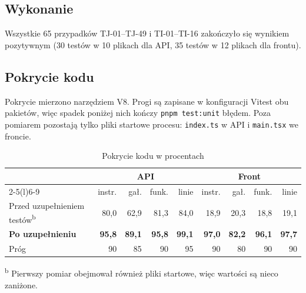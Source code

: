 \documentclass[a4paper,11pt]{article}
\newcommand{\code}[1]{\texttt{\small #1}}
\begin{document}
\subsection{Wykonanie}
Wszystkie 65 przypadków TJ-01–TJ-49 i TI-01–TI-16 zakończyło się wynikiem pozytywnym
(30 testów w 10 plikach dla API, 35 testów w 12 plikach dla frontu).

\subsection{Pokrycie kodu}
Pokrycie mierzono narzędziem V8. Progi są zapisane w konfiguracji Vitest obu pakietów,
więc spadek poniżej nich kończy \code{pnpm test:unit} błędem. Poza pomiarem pozostają tylko
pliki startowe procesu: \code{index.ts} w API i \code{main.tsx} we froncie.

\begin{table}[H]
\centering\small
\begin{tabular}{@{}l rrrr rrrr@{}}
\toprule
& \multicolumn{4}{c}{\textsf{\textbf{API}}} & \multicolumn{4}{c}{\textsf{\textbf{Front}}}\\
\cmidrule(lr){2-5}\cmidrule(l){6-9}
& instr. & gał. & funk. & linie & instr. & gał. & funk. & linie\\
\midrule
Przed uzupełnieniem testów\textsuperscript{b} & 80,0 & 62,9 & 81,3 & 84,0 & 18,9 & 20,3 & 18,8 & 19,1\\
\textbf{Po uzupełnieniu} & \textbf{95,8} & \textbf{89,1} & \textbf{95,8} & \textbf{99,1} & \textbf{97,0} & \textbf{82,2} & \textbf{96,1} & \textbf{97,7}\\
Próg & 90 & 85 & 90 & 95 & 90 & 80 & 90 & 90\\
\bottomrule
\end{tabular}
\par\smallskip
\raggedright\footnotesize\textsuperscript{b} Pierwszy pomiar obejmował również pliki startowe, więc wartości są nieco zaniżone.
\caption{Pokrycie kodu w procentach}
\end{table}

\begin{center}
\end{center}
\end{document}
